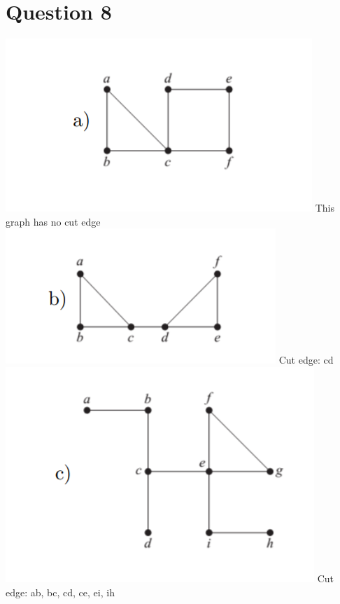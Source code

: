 \documentclass{article}
\begin{document}
\section*{Question 8}
\includegraphics[]{Question 7/connectivity_7.1.png}
\newline
This graph has no cut edge
\newline
\includegraphics[]{Question 7/connectivity_7.2.png}
\newline
Cut edge: cd
\newline
\includegraphics[]{Question 7/connectivity_7.3.png}
\newline
Cut edge: ab, bc, cd, ce, ei, ih
\end{document}
